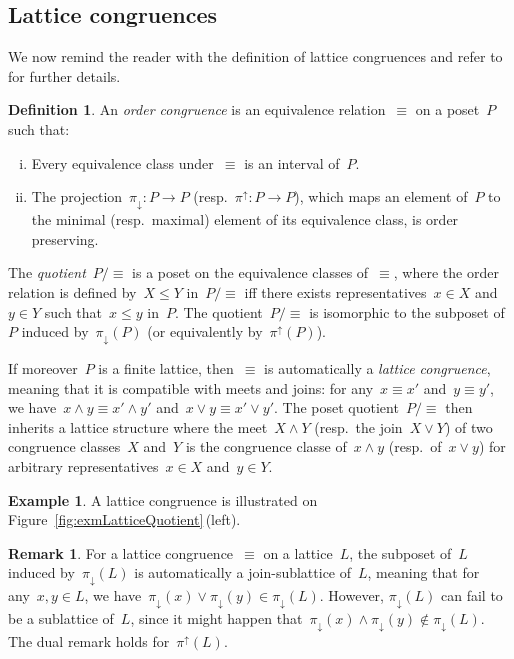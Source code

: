 \documentclass{amsart}
\theoremstyle{definition}
\newtheorem{definition}[theorem]{Definition}
\newtheorem{example}[theorem]{Example}
\newtheorem{remark}[theorem]{Remark}
\newcommand{\fref}[1]{Figure~\ref{#1}} %
\newcommand{\darkblue}{\color{darkblue}} %
\newcommand{\defn}[1]{\textsl{\darkblue #1}} %
\newcommand{\meet}{\wedge} %
\newcommand{\join}{\vee} %
\newcommand{\projDown}{\pi_\downarrow} %
\newcommand{\projUp}{\pi^\uparrow} %
\begin{document}
\subsection{Lattice congruences}
\label{sec:latticeTheory}

We now remind the reader with the definition of lattice congruences and refer to~\cite{Reading-LatticeCongruences, Reading-CambrianLattices} for further details.

\begin{definition}
An \defn{order congruence} is an equivalence relation~$\equiv$ on a poset~$P$ such that:
\begin{enumerate}[(i)]
\item Every equivalence class under~$\equiv$ is an interval of~$P$.
\item The projection~$\projDown : P \to P$ (resp.~$\projUp : P \to P$), which maps an element of~$P$ to the minimal (resp.~maximal) element of its equivalence class, is order preserving.
\end{enumerate}
The \defn{quotient}~$P/{\equiv}$ is a poset on the equivalence classes of~$\equiv$, where the order relation is defined by~$X \le Y$ in~$P/{\equiv}$ iff there exists representatives~$x \in X$ and~$y \in Y$ such that~$x \le y$ in~$P$. The quotient~$P/{\equiv}$ is isomorphic to the subposet of~$P$ induced by~$\projDown(P)$ (or equivalently by~$\projUp(P)$).

If moreover~$P$ is a finite lattice, then~$\equiv$ is automatically a \defn{lattice congruence}, meaning that it is compatible with meets and joins: for any~$x \equiv x'$ and~$y \equiv y'$, we have~$x \meet y \equiv x' \meet y'$ and~$x \join y \equiv x' \join y'$. The poset quotient~$P/{\equiv}$ then inherits a lattice structure where the meet~$X \meet Y$ (resp.~the join~$X \join Y$) of two congruence classes~$X$ and~$Y$ is the congruence classe of~$x \meet y$ (resp.~of~$x \join y$) for arbitrary representatives~$x \in X$ and~$y \in Y$.
\end{definition}

\begin{example}
A lattice congruence is illustrated on \fref{fig:exmLatticeQuotient}\,(left).
\end{example}

\begin{remark}
\label{rem:sublattice}
For a lattice congruence~$\equiv$ on a lattice~$L$, the subposet of~$L$ induced by~$\projDown(L)$ is automatically a join-sublattice of~$L$, meaning that for any~$x,y \in L$, we have~${\projDown(x) \join \projDown(y) \in \projDown(L)}$.
However, $\projDown(L)$ can fail to be a sublattice of~$L$, since it might happen that~$\projDown(x) \meet \projDown(y) \notin \projDown(L)$.
The dual remark holds for~$\projUp(L)$.
\end{remark}
\end{document}
